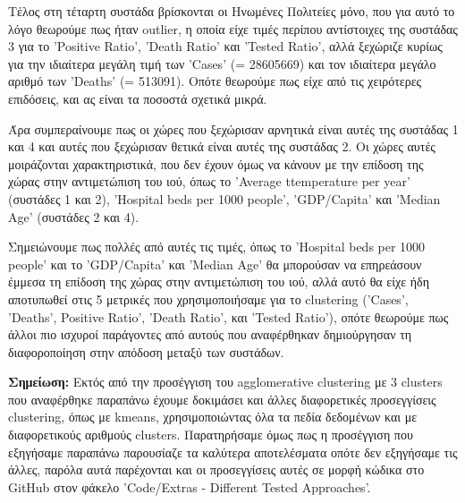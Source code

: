 \documentclass[12pt,a4paper]{article}
\begin{document}
Τέλος στη τέταρτη συστάδα βρίσκονται οι Ηνωμένες Πολιτείες μόνο, που για αυτό το λόγο θεωρούμε πως ήταν outlier, η οποία είχε τιμές περίπου αντίστοιχες της συστάδας 3 για το 'Positive Ratio', 'Death Ratio' και 'Tested Ratio', αλλά ξεχώριζε κυρίως για την ιδιαίτερα μεγάλη τιμή των 'Cases' (= 28605669) και τον ιδιαίτερα μεγάλο αριθμό των 'Deaths' (= 513091). Οπότε θεωρούμε πως είχε από τις χειρότερες επιδόσεις, και ας είναι τα ποσοστά σχετικά μικρά.

Άρα συμπεραίνουμε πως οι χώρες που ξεχώρισαν αρνητικά είναι αυτές της συστάδας 1 και 4 και αυτές που ξεχώρισαν θετικά είναι αυτές της συστάδας 2. Οι χώρες αυτές μοιράζονται χαρακτηριστικά, που δεν έχουν όμως να κάνουν με την επίδοση της χώρας στην αντιμετώπιση του ιού, όπως το 'Average ttemperature per year' (συστάδες 1 και 2), 'Hospital beds per 1000 people', 'GDP/Capita' και 'Median Age' (συστάδες 2 και 4).

Σημειώνουμε πως πολλές από αυτές τις τιμές, όπως το 'Hospital beds per 1000 people' και το 'GDP/Capita' και 'Median Age' θα μπορούσαν να επηρεάσουν έμμεσα τη επίδοση της χώρας στην αντιμετώπιση του ιού, αλλά αυτό θα είχε ήδη αποτυπωθεί στις 5 μετρικές που χρησιμοποιήσαμε για το clustering ('Cases', 'Deaths', Positive Ratio', 'Death Ratio', και 'Tested Ratio'), οπότε θεωρούμε πως άλλοι πιο ισχυροί παράγοντες από αυτούς που αναφέρθηκαν δημιούργησαν τη διαφοροποίηση στην απόδοση μεταξύ των συστάδων.

\textbf{Σημείωση:} Εκτός από την προσέγγιση του agglomerative clustering με 3 clusters που αναφέρθηκε παραπάνω έχουμε δοκιμάσει και άλλες διαφορετικές προσεγγίσεις clustering, όπως με kmeans, χρησιμοποιώντας όλα τα πεδία δεδομένων και με διαφορετικούς αριθμούς clusters. Παρατηρήσαμε όμως πως η προσέγγιση που εξηγήσαμε παραπάνω παρουσίαζε τα καλύτερα αποτελέσματα οπότε δεν εξηγήσαμε τις άλλες, παρόλα αυτά παρέχονται και οι προσεγγίσεις αυτές σε μορφή κώδικα στο GitHub στον φάκελο 'Code/Extras - Different Tested Approaches'.
\end{document}

